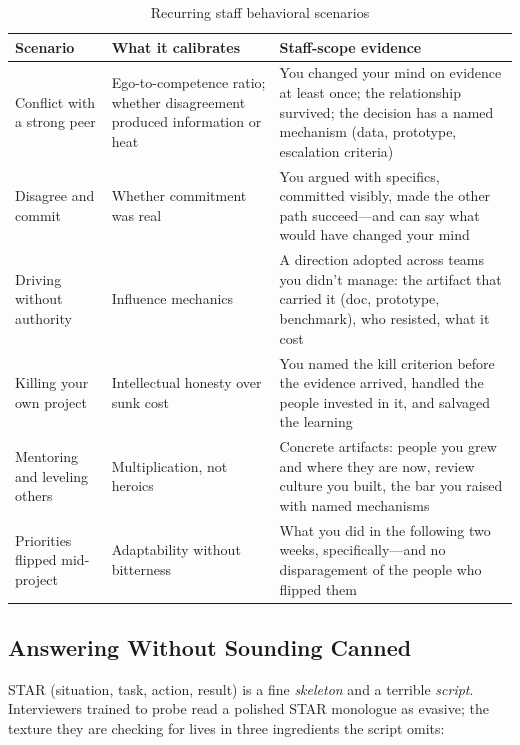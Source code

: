 \begin{table}[H]
\centering
\small
\caption{Recurring staff behavioral scenarios}
\label{tab:behavioral_scenarios}
\begin{tabularx}{\textwidth}{lXX}
\toprule
\textbf{Scenario} & \textbf{What it calibrates} & \textbf{Staff-scope evidence} \\
\midrule
Conflict with a strong peer & Ego-to-competence ratio; whether disagreement produced information or heat & You changed your mind on evidence at least once; the relationship survived; the decision has a named mechanism (data, prototype, escalation criteria) \\
Disagree and commit & Whether commitment was real & You argued with specifics, committed visibly, made the other path succeed---and can say what would have changed your mind \\
Driving without authority & Influence mechanics & A direction adopted across teams you didn't manage: the artifact that carried it (doc, prototype, benchmark), who resisted, what it cost \\
Killing your own project & Intellectual honesty over sunk cost & You named the kill criterion before the evidence arrived, handled the people invested in it, and salvaged the learning \\
Mentoring and leveling others & Multiplication, not heroics & Concrete artifacts: people you grew and where they are now, review culture you built, the bar you raised with named mechanisms \\
Priorities flipped mid-project & Adaptability without bitterness & What you did in the following two weeks, specifically---and no disparagement of the people who flipped them \\
\bottomrule
\end{tabularx}
\end{table}

\subsection{Answering Without Sounding Canned}

STAR (situation, task, action, result) is a fine \textit{skeleton} and a terrible \textit{script}. Interviewers trained to probe read a polished STAR monologue as evasive; the texture they are checking for lives in three ingredients the script omits:

